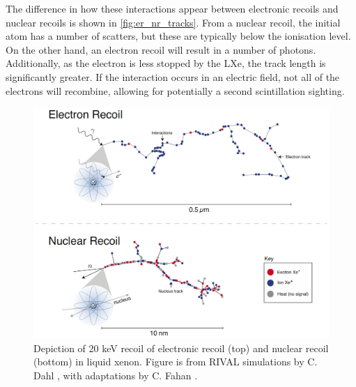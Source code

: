 \par
The difference in how these interactions appear between electronic recoils and nuclear recoils is shown in \autoref{fig:er_nr_tracks}.
From a nuclear recoil, the initial atom has a number of scatters, but these are typically below the ionisation level.
On the other hand, an electron recoil will result in a number of photons.
Additionally, as the electron is less stopped by the LXe, the track length is significantly greater.
If the interaction occurs in an electric field, not all of the electrons will recombine, allowing for potentially a second scintillation sighting.

\begin{figure}
    \centering
    \includegraphics[width=\textwidth]{Figures/LZ/er_nr_tracks.png}
    \caption[Depiction of a 20 keV recoil on liquid xenon]{Depiction of 20 keV recoil of electronic recoil (top) and nuclear recoil (bottom) in liquid xenon.
    Figure is from RIVAL simulations by C. Dahl \cite{carldahl_thesis_ref}, with adaptations by C. Fahan \cite{carlosfahan_thesis_ref}.}
    \label{fig:er_nr_tracks}
\end{figure}

